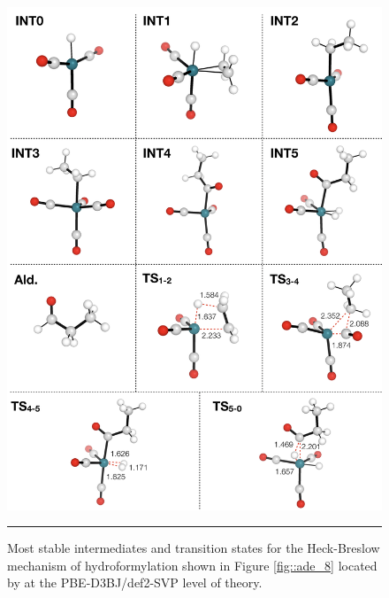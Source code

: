 \documentclass[../../main.tex]{subfiles}
\begin{document}
\begin{figure}[h!]
	\vspace{0.4cm}
	\centering
	\includegraphics[width=13cm]{5/autode/figs/figS15}
	\vspace{0.2cm}
	\hrule
	\caption{Most stable intermediates and transition states for the Heck-Breslow mechanism of hydroformylation shown in Figure \ref{fig::ade_8} located by \ade at the PBE-D3BJ/def2-SVP level of theory.}
	\label{fig::ade_si_15}
\end{figure}
\end{document}
